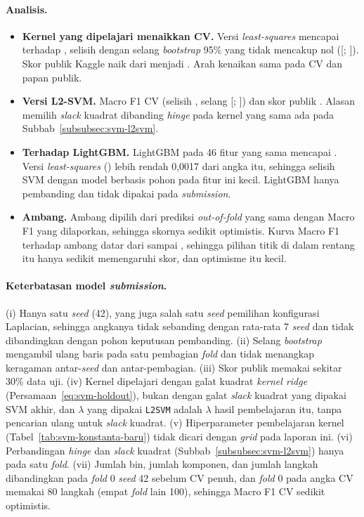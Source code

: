 \paragraph{Analisis.}
\begin{itemize}
	\item \textbf{Kernel yang dipelajari menaikkan CV.} Versi \textit{least-squares} mencapai \SVMLSCV{} terhadap \SVMLamaCV{}, selisih \SVMLSSelisih{} dengan selang \textit{bootstrap} 95\% yang tidak mencakup nol ([\SVMLSSelisihBawah{}; \SVMLSSelisihAtas{}]). Skor publik Kaggle naik dari \SVMLamaPublik{} menjadi \SVMLSPublik{}. Arah kenaikan sama pada CV dan papan publik.
	\item \textbf{Versi L2-SVM.} Macro F1 CV \SVMBaruCV{} (selisih \SVMBaruSelisih{}, selang [\SVMBaruSelisihBawah{}; \SVMBaruSelisihAtas{}]) dan skor publik \SVMBaruPublik{}. Alasan memilih \textit{slack} kuadrat dibanding \textit{hinge} pada kernel yang sama ada pada Subbab~\ref{subsubsec:svm-l2svm}.
	\item \textbf{Terhadap LightGBM.} LightGBM pada 46 fitur yang sama mencapai \SVMLightGBMCV{}. Versi \textit{least-squares} (\SVMLSCV{}) lebih rendah 0,0017 dari angka itu, sehingga selisih SVM dengan model berbasis pohon pada fitur ini kecil. LightGBM hanya pembanding dan tidak dipakai pada \textit{submission}.
	\item \textbf{Ambang.} Ambang \SVMBaruAmbang{} dipilih dari prediksi \textit{out-of-fold} yang sama dengan Macro F1 yang dilaporkan, sehingga skornya sedikit optimistis. Kurva Macro F1 terhadap ambang datar dari \SVMBaruDatarBawah{} sampai \SVMBaruDatarAtas{}, sehingga pilihan titik di dalam rentang itu hanya sedikit memengaruhi skor, dan optimisme itu kecil.
\end{itemize}

\paragraph{Keterbatasan model \textit{submission}.} (i) Hanya satu \textit{seed} (42), yang juga salah satu \textit{seed} pemilihan konfigurasi Laplacian, sehingga angkanya tidak sebanding dengan rata-rata 7 \textit{seed} dan tidak dibandingkan dengan pohon keputusan pembanding. (ii) Selang \textit{bootstrap} mengambil ulang baris pada satu pembagian \textit{fold} dan tidak menangkap keragaman antar-\textit{seed} dan antar-pembagian. (iii) Skor publik memakai sekitar 30\% data uji. (iv) Kernel dipelajari dengan galat kuadrat \textit{kernel ridge} (Persamaan~\eqref{eq:svm-holdout}), bukan dengan galat \textit{slack} kuadrat yang dipakai SVM akhir, dan $\lambda$ yang dipakai \texttt{L2SVM} adalah $\lambda$ hasil pembelajaran itu, tanpa pencarian ulang untuk \textit{slack} kuadrat. (v) Hiperparameter pembelajaran kernel (Tabel~\ref{tab:svm-konstanta-baru}) tidak dicari dengan \textit{grid} pada laporan ini. (vi) Perbandingan \textit{hinge} dan \textit{slack} kuadrat (Subbab~\ref{subsubsec:svm-l2svm}) hanya pada satu \textit{fold}. (vii) Jumlah bin, jumlah komponen, dan jumlah langkah dibandingkan pada \textit{fold} 0 \textit{seed} 42 sebelum CV penuh, dan \textit{fold} 0 pada angka CV memakai 80 langkah (empat \textit{fold} lain 100), sehingga Macro F1 CV sedikit optimistis.

